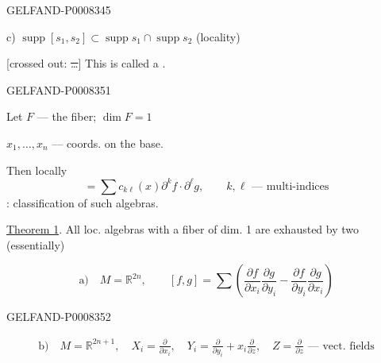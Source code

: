 \begin{GelfandAdjacentEvidence}{GELFAND-P000834}{5}


c) \(\operatorname{supp}[s_1,s_2]\subset
\operatorname{supp}s_1\cap\operatorname{supp}s_2\)
\qquad (locality)

[crossed out: \sout{…}] This is called a .
\end{GelfandAdjacentEvidence}



\begin{GelfandAdjacentEvidence}{GELFAND-P000835}{1}

Let \(F\) — the fiber; \(\dim F=1\)

\(x_1,\ldots,x_n\) — coords. on the base.

Then locally
\begin{equation*}
[f,g]=\sum c_{k\ell}(x)\partial^k f\cdot\partial^\ell g,
\qquad k,\ell\text{ — multi-indices}
\tag{1}
\end{equation*}
: classification of such algebras.

\uline{Theorem 1}. All loc. algebras with a fiber of dim. 1 are exhausted by two (essentially)

\begin{equation*}
\text{a)}\quad M=\mathbb R^{2n},\qquad
[f,g]=\sum\left(\frac{\partial f}{\partial x_i}\frac{\partial g}{\partial y_i}
-\frac{\partial f}{\partial y_i}\frac{\partial g}{\partial x_i}\right)
\tag{2}
\end{equation*}
\end{GelfandAdjacentEvidence}
\begin{GelfandAdjacentEvidence}{GELFAND-P000835}{2}


\begin{equation*}
\begin{gathered}
\text{b)}\quad M=\mathbb R^{2n+1},\quad
X_i=\frac{\partial}{\partial x_i},\quad
Y_i=\frac{\partial}{\partial y_i}+x_i\frac{\partial}{\partial z},\quad
Z=\frac{\partial}{\partial z}\text{ — vect. fields}
\end{gathered}
\tag{3}
\end{equation*}
\end{GelfandAdjacentEvidence}
